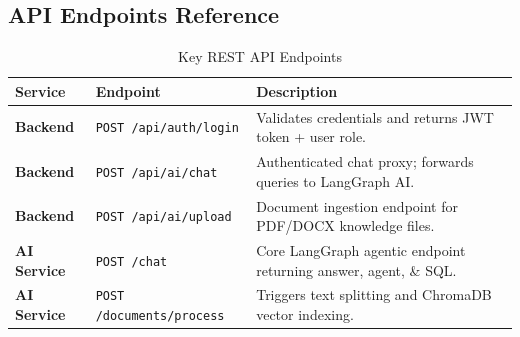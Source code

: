 \documentclass[11pt,a4paper]{article}
\begin{document}
\subsection{API Endpoints Reference}
\begin{table}[h!]
\centering
\small
\begin{tabularx}{\textwidth}{l l X}
\toprule
\textbf{Service} & \textbf{Endpoint} & \textbf{Description} \\
\midrule
\textbf{Backend} & \texttt{POST /api/auth/login} & Validates credentials and returns JWT token + user role. \\
\textbf{Backend} & \texttt{POST /api/ai/chat} & Authenticated chat proxy; forwards queries to LangGraph AI. \\
\textbf{Backend} & \texttt{POST /api/ai/upload} & Document ingestion endpoint for PDF/DOCX knowledge files. \\
\textbf{AI Service} & \texttt{POST /chat} & Core LangGraph agentic endpoint returning answer, agent, \& SQL. \\
\textbf{AI Service} & \texttt{POST /documents/process} & Triggers text splitting and ChromaDB vector indexing. \\
\bottomrule
\end{tabularx}
\caption{Key REST API Endpoints}
\end{table}
\end{document}
